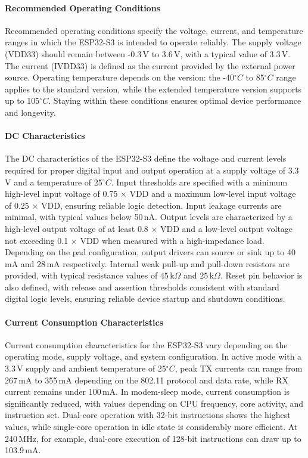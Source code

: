 \paragraph{Recommended Operating Conditions}
Recommended operating conditions specify the voltage, current, and temperature ranges in which the ESP32-S3 is intended to operate reliably. The supply voltage (VDD33) should remain between -0.3\,V to 3.6\,V, with a typical value of 3.3\,V. The current (IVDD33) is defined as the current provided by the external power source. Operating temperature depends on the version: the -40$^\circ C$ to 85$^\circ C$ range applies to the standard version, while the extended temperature version supports up to 105$^\circ C$. Staying within these conditions ensures optimal device performance and longevity.

\paragraph{DC Characteristics }
The DC characteristics of the ESP32-S3 define the voltage and current levels required for proper digital input and output operation at a supply voltage of 3.3\,V and a temperature of 25$^\circ C$. Input thresholds are specified with a minimum high-level input voltage of 0.75 × VDD and a maximum low-level input voltage of 0.25 × VDD, ensuring reliable logic detection. Input leakage currents are minimal, with typical values below 50\,nA. Output levels are characterized by a high-level output voltage of at least 0.8 × VDD and a low-level output voltage not exceeding 0.1 × VDD when measured with a high-impedance load. Depending on the pad configuration, output drivers can source or sink up to 40\,mA and 28\,mA respectively. Internal weak pull-up and pull-down resistors are provided, with typical resistance values of $45\,\mathrm{k}\Omega$ and $25\,\mathrm{k}\Omega$. Reset pin behavior is also defined, with release and assertion thresholds consistent with standard digital logic levels, ensuring reliable device startup and shutdown conditions.

\paragraph{Current Consumption Characteristics}
Current consumption characteristics for the ESP32-S3 vary depending on the operating mode, supply voltage, and system configuration. In active mode with a 3.3\,V supply and ambient temperature of 25$^\circ C$, peak TX currents can range from 267\,mA to 355\,mA depending on the 802.11 protocol and data rate, while RX current remains under 100\,mA. In modem-sleep mode, current consumption is significantly reduced, with values depending on CPU frequency, core activity, and instruction set. Dual-core operation with 32-bit instructions shows the highest values, while single-core operation in idle state is considerably more efficient. At 240\,MHz, for example, dual-core execution of 128-bit instructions can draw up to 103.9\,mA.

